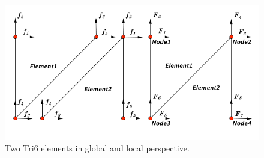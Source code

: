\begin{figure}[h]
	\begin{center}
		\includegraphics[width=12cm,clip]{assembly.pdf}			
		\caption{Two Tri6 elements in global and local perspective.} \label{fig: assembly}
	\end{center} 
\end{figure}

